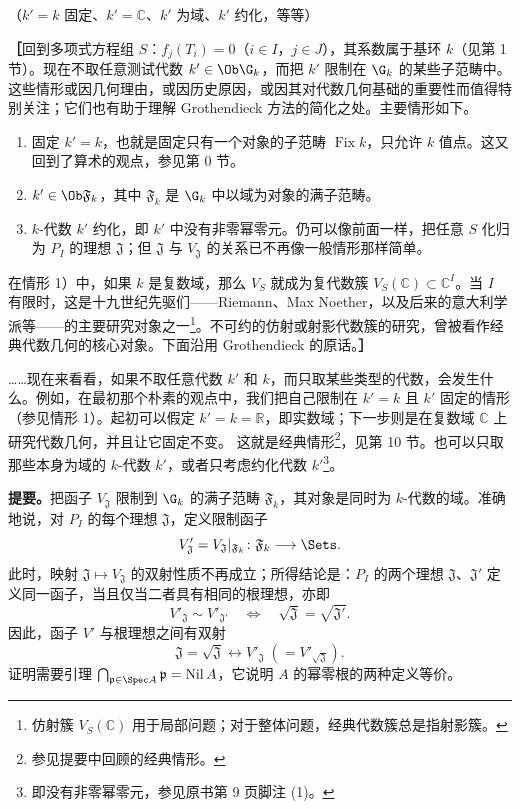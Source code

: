 \begin{center}（$k'=k$ 固定、$k'=\mathbb C$、$k'$ 为域、$k'$ 约化，等等）\end{center}
\textbf{［}回到多项式方程组 $S$：$f_j(T_i)=0$（$i\in I$，$j\in J$），其系数属于基环 $k$（见第 1 节）。现在不取任意测试代数 $k'\in\Ob\G_k$，而把 $k'$ 限制在 $\G_k$ 的某些子范畴中。这些情形或因几何理由，或因历史原因，或因其对代数几何基础的重要性而值得特别关注；它们也有助于理解 Grothendieck 方法的简化之处。主要情形如下。
\begin{enumerate}[label=\arabic*)]
\item 固定 $k'=k$，也就是固定只有一个对象的子范畴 $\operatorname{Fix}k$，只允许 $k$ 值点。这又回到了算术的观点，参见第 0 节。
\item $k'\in\Ob\mathfrak F_k$，其中 $\mathfrak F_k$ 是 $\G_k$ 中以域为对象的满子范畴。
\item $k$-代数 $k'$ 约化，即 $k'$ 中没有非零幂零元。仍可以像前面一样，把任意 $S$ 化归为 $P_I$ 的理想 $\mathfrak J$；但 $\mathfrak J$ 与 $V_{\mathfrak J}$ 的关系已不再像一般情形那样简单。
\end{enumerate}
在情形 1）中，如果 $k$ 是复数域，那么 $V_S$ 就成为复代数簇 $V_S(\mathbb C)\subset\mathbb C^I$。当 $I$ 有限时，这是十九世纪先驱们——Riemann、Max Noether，以及后来的意大利学派等——的主要研究对象之一\footnote{仿射簇 $V_S(\mathbb C)$ 用于局部问题；对于整体问题，经典代数簇总是指射影簇。}。不可约的仿射或射影代数簇的研究，曾被看作经典代数几何的核心对象。下面沿用 Grothendieck 的原话。\textbf{］}

……现在来看看，如果不取任意代数 $k'$ 和 $k$，而只取某些类型的代数，会发生什么。例如，在最初那个朴素的观点中，我们把自己限制在 $k'=k$ 且 $k'$ 固定的情形（参见情形 1）。起初可以假定 $k'=k=\mathbb R$，即实数域；下一步则是在复数域 $\mathbb C$ 上研究代数几何，并且让它固定不变。
这就是经典情形\footnote{参见提要中回顾的经典情形。}，见第 10 节。也可以只取那些本身为域的 $k$-代数 $k'$，或者只考虑约化代数 $k'$\footnote{即没有非零幂零元，参见原书第 9 页脚注 (1)。}。

\textbf{提要。}把函子 $V_{\mathfrak J}$ 限制到 $\G_k$ 的满子范畴 $\mathfrak F_k$，其对象是同时为 $k$-代数的域。准确地说，对 $P_I$ 的每个理想 $\mathfrak J$，定义限制函子
\[
V'_{\mathfrak J}=V_{\mathfrak J}|_{\mathfrak F_k}\colon\mathfrak F_k\longrightarrow\Sets.
\]
此时，映射 $\mathfrak J\mapsto V_{\mathfrak J}$ 的双射性质不再成立；所得结论是：$P_I$ 的两个理想 $\mathfrak J$、$\mathfrak J'$ 定义同一函子，当且仅当二者具有相同的根理想，亦即
\[
V'_{\mathfrak J}\sim V'_{\mathfrak J'}\quad\Longleftrightarrow\quad\sqrt{\mathfrak J}=\sqrt{\mathfrak J'}.
\]
因此，函子 $V'$ 与根理想之间有双射
\[
\mathfrak J=\sqrt{\mathfrak J}\longleftrightarrow V'_{\mathfrak J}\;(=V'_{\sqrt{\mathfrak J}}).
\]
证明需要引理 $\bigcap_{\mathfrak p\in\Spec A}\mathfrak p=\operatorname{Nil}A$，它说明 $A$ 的幂零根的两种定义等价。


